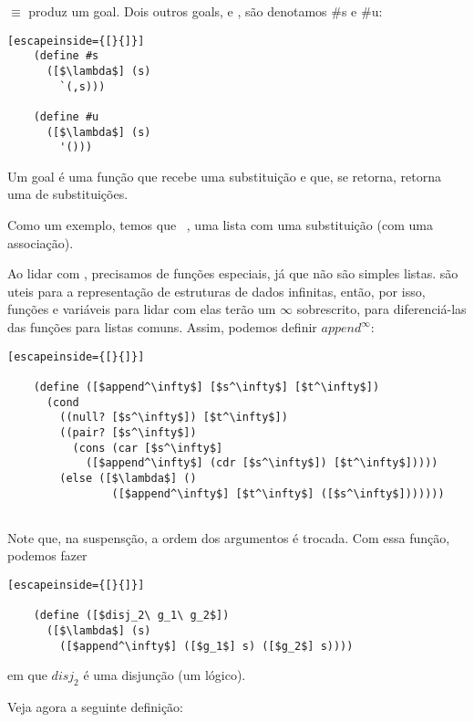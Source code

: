 \documentclass{article}
\begin{document}
  \noindent $\equiv $ produz um goal. Dois outros goals, 
  e , são denotamos \#s e \#u:\\

  \begin{lstlisting}[escapeinside={[}{]}]
    (define #s
      ([$\lambda$] (s)
        `(,s)))

    (define #u
      ([$\lambda$] (s)
        '()))
  \end{lstlisting}

  Um goal é uma função que recebe uma substituição e que, se retorna,
  retorna uma  de substituições.

  Como um exemplo, temos que  \seta\
  , uma lista com uma substituição (com uma
  associação).

  Ao lidar com , precisamos de funções especiais,
  já que não são simples listas. \technical{Streams} são uteis para a
  representação de estruturas de dados infinitas, então, por isso,
  funções e variáveis para lidar com elas terão um $\infty$ sobrescrito,
  para diferenciá-las das funções para listas comuns. Assim, podemos
  definir $append^\infty$:

  \begin{lstlisting}[escapeinside={[}{]}]

    (define ([$append^\infty$] [$s^\infty$] [$t^\infty$])
      (cond
        ((null? [$s^\infty$]) [$t^\infty$])
        ((pair? [$s^\infty$])
          (cons (car [$s^\infty$]
            ([$append^\infty$] (cdr [$s^\infty$]) [$t^\infty$]))))
        (else ([$\lambda$] ()
                ([$append^\infty$] [$t^\infty$] ([$s^\infty$]))))))
        
  \end{lstlisting}

  \noindent Note que, na suspensção, a ordem dos argumentos é trocada.
  Com essa função, podemos fazer

  \begin{lstlisting}[escapeinside={[}{]}]

    (define ([$disj_2\ g_1\ g_2$])
      ([$\lambda$] (s)
        ([$append^\infty$] ([$g_1$] s) ([$g_2$] s))))

  \end{lstlisting}
      
  \noindent em que $disj_2$ é uma disjunção (um 
  lógico). 

  Veja agora a seguinte definição:
\end{document}
